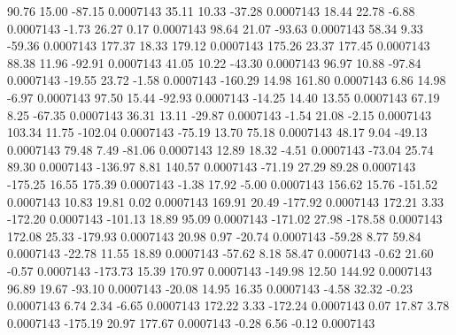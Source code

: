        90.76       15.00      -87.15     0.0007143
       35.11       10.33      -37.28     0.0007143
       18.44       22.78       -6.88     0.0007143
       -1.73       26.27        0.17     0.0007143
       98.64       21.07      -93.63     0.0007143
       58.34        9.33      -59.36     0.0007143
      177.37       18.33      179.12     0.0007143
      175.26       23.37      177.45     0.0007143
       88.38       11.96      -92.91     0.0007143
       41.05       10.22      -43.30     0.0007143
       96.97       10.88      -97.84     0.0007143
      -19.55       23.72       -1.58     0.0007143
     -160.29       14.98      161.80     0.0007143
        6.86       14.98       -6.97     0.0007143
       97.50       15.44      -92.93     0.0007143
      -14.25       14.40       13.55     0.0007143
       67.19        8.25      -67.35     0.0007143
       36.31       13.11      -29.87     0.0007143
       -1.54       21.08       -2.15     0.0007143
      103.34       11.75     -102.04     0.0007143
      -75.19       13.70       75.18     0.0007143
       48.17        9.04      -49.13     0.0007143
       79.48        7.49      -81.06     0.0007143
       12.89       18.32       -4.51     0.0007143
      -73.04       25.74       89.30     0.0007143
     -136.97        8.81      140.57     0.0007143
      -71.19       27.29       89.28     0.0007143
     -175.25       16.55      175.39     0.0007143
       -1.38       17.92       -5.00     0.0007143
      156.62       15.76     -151.52     0.0007143
       10.83       19.81        0.02     0.0007143
      169.91       20.49     -177.92     0.0007143
      172.21        3.33     -172.20     0.0007143
     -101.13       18.89       95.09     0.0007143
     -171.02       27.98     -178.58     0.0007143
      172.08       25.33     -179.93     0.0007143
       20.98        0.97      -20.74     0.0007143
      -59.28        8.77       59.84     0.0007143
      -22.78       11.55       18.89     0.0007143
      -57.62        8.18       58.47     0.0007143
       -0.62       21.60       -0.57     0.0007143
     -173.73       15.39      170.97     0.0007143
     -149.98       12.50      144.92     0.0007143
       96.89       19.67      -93.10     0.0007143
      -20.08       14.95       16.35     0.0007143
       -4.58       32.32       -0.23     0.0007143
        6.74        2.34       -6.65     0.0007143
      172.22        3.33     -172.24     0.0007143
        0.07       17.87        3.78     0.0007143
     -175.19       20.97      177.67     0.0007143
       -0.28        6.56       -0.12     0.0007143
